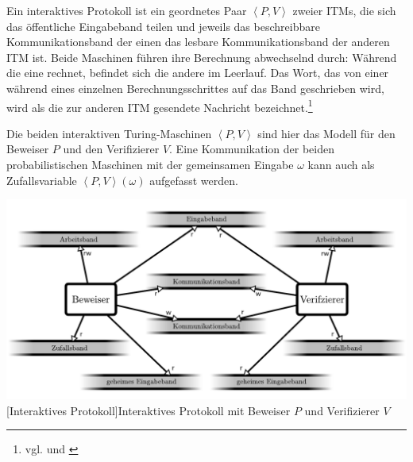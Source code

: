 \vspace{0.2cm}

\begin{definition}
Ein interaktives Protokoll ist ein geordnetes Paar \( \left< P, V \right> \) zweier ITMs, die sich das \glqq{}öffentliche\grqq{} Eingabeband teilen und jeweils das beschreibbare Kommunikationsband der einen das lesbare Kommunikationsband der anderen ITM ist. Beide Maschinen führen ihre Berechnung abwechselnd durch: Während die eine rechnet, befindet sich die andere im \glqq{}Leerlauf\grqq{}. Das Wort, das von einer während eines einzelnen Berechnungsschrittes auf das Band geschrieben wird, wird als die zur anderen ITM \textnormal{gesendete Nachricht} bezeichnet.\footnote{vgl. \cite[Abschnitt 2.1]{goldwasser1989} und \cite[Definition 1.3]{np}}
\end{definition}

Die beiden interaktiven Turing-Maschinen \( \left< P, V\right> \) sind hier das Modell für den Beweiser \( P \) und den Verifizierer \( V \). Eine Kommunikation der beiden probabilistischen Maschinen mit der gemeinsamen Eingabe \( \omega \) kann auch als Zufallsvariable \( \left< P, V \right> \left( \omega \right) \) aufgefasst werden.

\vspace{1em}
\begin{minipage}{\linewidth}
	\centering
	\includegraphics[width=0.9\linewidth]{img/interactiveprotocol.pdf}
	[Interaktives Protokoll]{Interaktives Protokoll mit Beweiser \( P \) und Verifizierer \( V \)}
	\label{fig:interactiveprotocol}
\end{minipage}

\vspace{0.2cm}

